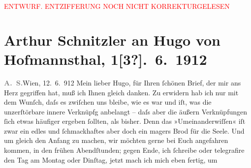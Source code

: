 
\begin{center}
            \textcolor{red}{ENTWURF. ENTZIFFERUNG NOCH NICHT KORREKTURGELESEN}
                      \end{center}
            
               \section[Arthur Schnitzler an Hugo von Hofmannsthal, 1{[}3?{]}. 6. 1912]{ Arthur Schnitzler an Hugo von Hofmannsthal, 1{[}3?{]}. 6. 1912}\nopagebreak{}\rehead{ }\begin{ledgroupsized}[t]{13cm}\normalsize\beginnumbering{} \toendnotes[C]{\smallbreak\pagebreak[2]} 
\toendnotes[C]{\smallbreak}\pstart
           {\pb}\textcolor{gray}{\textbf{A. S.}}\hfill Wien, 12. 6. 912\pend
           \pstart
           Mein lieber Hugo, für Ihren ſchönen Brief, der mir ans Herz
               gegriffen hat, muß ich Ihnen gleich danken. Zu erwidern hab ich nur mit dem Wunſch,
               daſs es zwiſchen uns bleibe, wie es war und iſt, was die unzerſtörbare innere
               Verknüpfg anbelangt – daſs aber die äußern Verknüpfungen ſich etwas {\pb}häufiger ergeben ſollten, als bisher. Denn das
               »Umeinanderwiſſen« iſt zwar ein edles und ſchmackhaftes aber doch ein magers Brod für
               die Seele. Und um gleich den Anfang zu machen, wir möchten gerne \label{K_L02075_1v}\label{K_L02075_1h} bei Euch angefahren kommen, in den frühen Abendſtunden; gegen Ende, ich
               ſchreibe oder telegrafire den Tag \introOben{}am\introOben{} Montag oder Dinſtag,
                  {\pb}jetzt mach ich mich eben fertig, um \label{K_L02075_2v}
\end{ledgroupsized}
